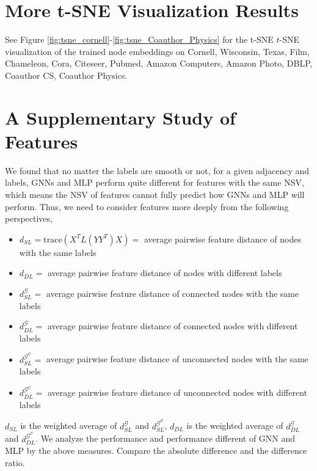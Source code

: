 \documentclass{article}
\newcommand{\trace}{\mathrm{trace}}
\newcommand{\0}{{\boldsymbol{0}}}
\newcommand{\6}{{\partial}}
\newcommand{\8}{{\infty}}
\newcommand{\4}{{\nabla}}
\begin{document}
\section{More t-SNE Visualization Results}
See Figure \ref{fig:tsne_cornell}-\ref{fig:tsne_Coauthor_Physics} for the t-SNE $t$-SNE visualization of the trained node embeddings on Cornell, Wisconsin, Texas, Film, Chameleon, Cora, Citeseer, Pubmed, Amazon Computers, Amazon Photo, DBLP, Coauthor CS, Coauthor Physics.


\section{A Supplementary Study of Features}

We found that no matter the labels are smooth or not, for a given adjacency and labels, GNNs and MLP perform quite different for features with the same NSV, which means the NSV of features cannot fully predict how GNNs and MLP will perform. Thus, we need to consider features more deeply from the following perspectives,
\begin{itemize}
    \item $d_{SL}= \trace(X^T L(YY^T)X) =$ average pairwise feature distance of nodes with the same labels
    \item $d_{DL}=$ average pairwise feature distance of nodes with different labels
    \item $d^{\mathcal{G}}_{SL}=$ average pairwise feature distance of connected nodes with the same labels
    \item $d^{\mathcal{G}}_{DL}=$ average pairwise feature distance of connected nodes with different labels
    \item $d^{\mathcal{G^C}}_{SL}=$ average pairwise feature distance of unconnected nodes with the same labels
    \item $d^{\mathcal{G^C}}_{DL}=$ average pairwise feature distance of unconnected nodes with different labels
\end{itemize}
$d_{SL}$ is the weighted average of $d^{\mathcal{G}}_{SL}$ and  $d^{\mathcal{G^C}}_{SL}$, $d_{DL}$ is the weighted average of $d^{\mathcal{G}}_{DL}$ and $d^{\mathcal{G^C}}_{DL}$. We analyze the performance and performance different of GNN and MLP by the above measures. Compare the absolute difference and the difference ratio.
\end{document}
